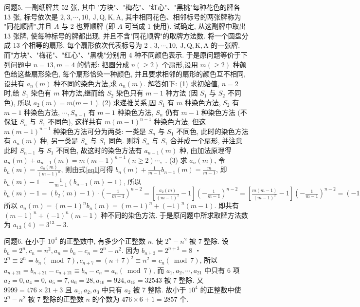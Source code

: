 问题5. 一副纸牌共 52 张, 其中 "方块"、"梅花"、"红心"、"黑桃"每种花色的牌各 13 张, 标号依次是 $2,3, \cdots, 10, \mathrm{~J}, \mathrm{Q}, \mathrm{K}, \mathrm{A}$, 其中相同花色、相邻标号的两张牌称为 "同花顺牌",并且 $A$ 与 2 也算顺牌 (即 $A$ 可当成 1 使用). 试确定, 从这副牌中取出 13 张牌, 使每种标号的牌都出现, 并且不含"同花顺牌"的取牌方法数.
将一个圆盘分成 13 个相等的扇形, 每个扇形依次代表标号为 2 , $3, \cdots, 10, \mathrm{~J}, \mathrm{Q}, \mathrm{K}, \mathrm{A}$ 的一张牌.
而"方块"、"梅花"、"红心"、"黑桃"分别用 4 种不同颜色表示.
于是原问题等价于下列问题中 $n=13, m=4$ 的情形: 把圆分成 $n(\geqslant 2)$ 个扇形,设用 $m(\geqslant 2)$ 种颜色给这些扇形染色, 每个扇形恰染一种颜色, 并且要求相邻的扇形的颜色互不相同, 设共有 $a_n(m)$ 种不同的染色方法,求 $a_n(m)$. 解答如下: 
(1) 求初始值, $n=2$ 时,给 $S_1$ 染色有 $m$ 种方法,继而给 $S_2$ 染色只有 $m-1$ 种方法 (因 $S_1$ 与 $S_2$ 不同色), 所以 $a_2(m)=m(m-1$ ). 
(2) 求递推关系,因 $S_1$ 有 $m$ 种染色方法, $S_2$ 有 $m-1$ 种染色方法, $\cdots, S_{n-1}$ 有 $m-1$ 种染色方法, $S_n$ 仍有 $m-1$ 种染色方法 (不保证 $S_n$ 与 $S_1$ 不同色), 这样共有 $m(m-1)^{n-1}$ 种染色方法, 但这 $m(m-1)^{n-1}$ 种染色方法可分为两类: 一类是 $S_n$ 与 $S_1$ 不同色, 此时的染色方法有 $a_n(m)$ 种, 另一类是 $S_n$ 与 $S_1$ 同色.
则将 $S_n$ 与 $S_1$ 合并成一个扇形, 并注意此时 $S_{n-1}$ 与 $S_1$ 不同色, 故这时的染色方法有 $a_{n-1}(m)$ 种, 由加法原理得 $a_n(m)+a_{n-1}(m)=m(m-1)^{n-1}(n \geqslant 2) \cdots, \label{eq1}$ .
(3) 求 $a_n(m)$, 令 $b_n(m)=\frac{a_n(m)}{(m-1)^n}$, 则由式\ref{eq1}可得 $b_n(m)+\frac{1}{m-1} b_{n-1}(m)= \frac{m}{m-1}$, 即 $b_n(m)-1=-\frac{1}{m-1}\left(b_{n-1}(m)-1\right)$, 所以 $b_n(m)-1=\left(b_2(m)-1\right)\cdot\left(-\frac{1}{m-1}\right)^{n-2}=\left[\frac{a_2(m)}{(m-1)^2}-1\right]\left(-\frac{1}{m-1}\right)^{n-2}=\left[\frac{m(m-1)}{(m-1)^2}-1\right]\left(-\frac{1}{m-1}\right)^{n-2} =(-1)^n \frac{1}{(m-1)^{n-1}}$ 所以 $a_n(m)=(m-1)^n b_n(m)=(m-1)^n+(-1)^n(m-1)$. 即共有 $(m-1)^n+(-1)^n(m-1)$ 种不同的染色方法.
于是原问题中所求取牌方法数为 $a_{13}(4)=3^{13}-3$.



问题6. 在小于 $10^4$ 的正整数中, 有多少个正整数 $n$, 使 $2^n-n^2$ 被 7 整除.
设 $b_n=2^n, c_n=n^2, a_n=b_n-c_n=2^n-n^2$. 因为 $b_{n \vdash 3}=2^{n+3}=8$ ・ $2^n \equiv 2^n=b_n(\bmod 7), c_{n+7}=(n+7)^2 \equiv n^2=c_n(\bmod 7)$, 所以 $a_{n+21}=b_{n+21}- c_{n+21} \equiv b_n-c_n=a_n(\bmod 7)$, 而 $a_1, a_2, \cdots, a_{21}$ 中只有 6 项 $a_2=0, a_4=0$, $a_5=7, a_6=28, a_{10}=924, a_{15}=32543$ 被 7 整除.
又 $9999=476 \times 21+3$
且 $a_1, a_2, a_3$ 中只有 $a_2$ 被 7 整除.
故小于 $10^4$ 的正整数中使 $2^n-n^2$ 被 7 整除的正整数 $n$ 的个数为 $476 \times 6+1=2857$ 个.



